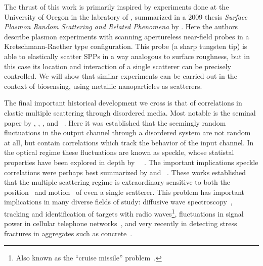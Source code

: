 The thrust of this work is primarily inspired by experiments done at the
University of Oregon in the labratory of , summarized
in a 2009 thesis \textit{Surface Plasmon Random Scattering and Related
Phenomena} \cite{schumann2009surface} by .  Here
the authors describe plasmon experiments with scanning apertureless
near-field probes in a Kretschmann-Raether type configuration.  This probe
(a sharp tungsten tip) is able to elastically scatter SPPs in a way
analogous to surface roughness, but in this case its location and
interaction of a single scatterer can be precisely controlled.  We will
show that similar experiments can be carried out in the context of
biosensing, using metallic nanoparticles as scatterers.

The final important historical development we cross is that of correlations
in elastic multiple scattering through disordered media.  Most notable is
the seminal paper by , , , and
~\cite{feng1988correlations}.  Here it was established that
the seemingly random fluctuations in the output channel through a
disordered system are not random at all, but contain correlations which
track the behavior of the input channel.  In the optical regime these
fluctuations are known as speckle, whose statistal properties have been
explored in depth by
~\cite{goodman2007speckle}~\cite{goodman1975statistical}.
The important implications speckle correlations were perhaps best
summarized by  and
~\cite{berkovits1994correlations}.  These works established that
the multiple scattering regime is extraordinary sensitive to both the
position~\cite{berkovits1990theory} and
motion~\cite{berkovits1991sensitivity} of even a single scatterer.  This
problem has important implications in many diverse fields of study:
diffusive wave spectroscopy~\cite{pine1988diffusing}, tracking and
identification of targets with radio waves\footnote{Also known as the
``cruise missile'' problem~\cite{atkins1991neural}.}, fluctuations in signal power in
cellular telephone networks~\cite{abdi2001estimation}, and
very recently in detecting stress fractures in aggregates such as
concrete~\cite{larose2010locating}.  


